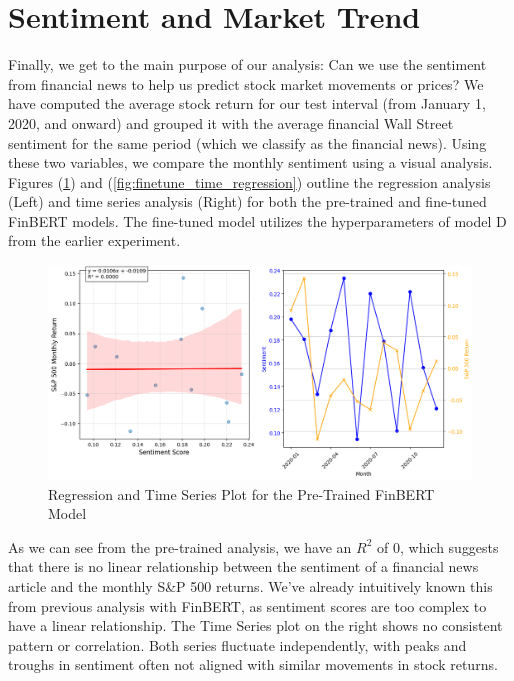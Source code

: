 \documentclass[12pt]{article}
\begin{document}
\section*{Sentiment and Market Trend}

Finally, we get to the main purpose of our analysis: Can we use the sentiment from financial news to help us predict stock market movements or prices? We have computed the average stock return for our test interval (from January 1, 2020, and onward) and grouped it with the average financial Wall Street sentiment for the same period (which we classify as the financial news). Using these two variables, we compare the monthly sentiment using a visual analysis. Figures (\ref{fig:pretrain_time_regression}) and (\ref{fig:finetune_time_regression}) outline the regression analysis (Left) and time series analysis (Right) for both the pre-trained and fine-tuned FinBERT models. The fine-tuned model utilizes the hyperparameters of model D from the earlier experiment.

\begin{figure}[h]
	\centering
	\includegraphics[width=1\linewidth]{plots/regression_time_pretrain.png}
	\caption{Regression and Time Series Plot for the Pre-Trained FinBERT Model}
	\label{fig:pretrain_time_regression}
\end{figure}

As we can see from the pre-trained analysis, we have an $R^2$ of 0, which suggests that there is no linear relationship between the sentiment of a financial news article and the monthly S\&P 500 returns. We've already intuitively known this from previous analysis with FinBERT, as sentiment scores are too complex to have a linear relationship. The Time Series plot on the right shows no consistent pattern or correlation. Both series fluctuate independently, with peaks and troughs in sentiment often not aligned with similar movements in stock returns.
\end{document}
